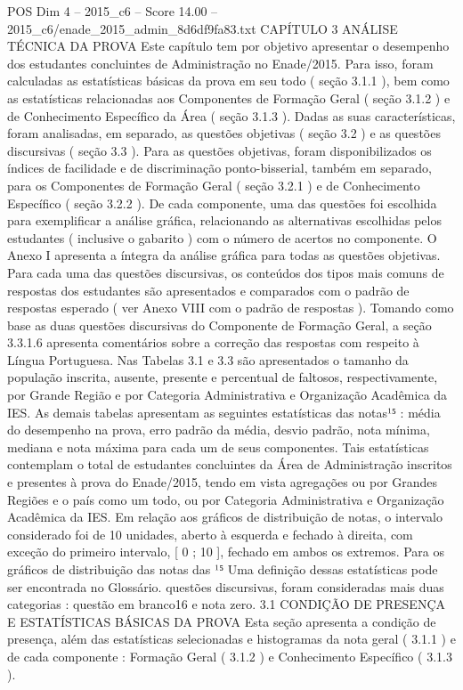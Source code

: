 \begin{textsample}{POS Dim 4 – 2015\_c6 – Score 14.00 – 2015\_c6/enade\_2015\_admin\_8d6df9fa83.txt}  \label{ex:f4_pos_023}
CAPÍTULO 3 ANÁLISE TÉCNICA DA PROVA Este capítulo tem por objetivo apresentar o desempenho dos estudantes concluintes de Administração no Enade/2015.
Para isso, foram calculadas as estatísticas básicas da prova em seu todo ( seção 3.1.1 ), bem como as estatísticas relacionadas aos Componentes de Formação Geral ( seção 3.1.2 ) e de Conhecimento Específico da Área ( seção 3.1.3 ).
Dadas as suas características, foram analisadas, em separado, as questões objetivas ( seção 3.2 ) e as questões discursivas ( seção 3.3 ).
Para as questões objetivas, foram disponibilizados os índices de facilidade e de discriminação ponto-bisserial, também em separado, para os Componentes de Formação Geral ( seção 3.2.1 ) e de Conhecimento Específico ( seção 3.2.2 ).
De cada componente, uma das questões foi escolhida para exemplificar a análise gráfica, relacionando as alternativas escolhidas pelos estudantes ( inclusive o gabarito ) com o número de acertos no componente.
O Anexo I apresenta a íntegra da análise gráfica para todas as questões objetivas.
Para cada uma das questões discursivas, os conteúdos dos tipos mais comuns de respostas dos estudantes são apresentados e comparados com o padrão de respostas esperado ( ver Anexo VIII com o padrão de respostas ).
Tomando como base as duas questões discursivas do Componente de Formação Geral, a seção 3.3.1.6 apresenta comentários sobre a correção das respostas com respeito à Língua Portuguesa.
Nas Tabelas 3.1 e 3.3 são apresentados o tamanho da população inscrita, ausente, presente e percentual de faltosos, respectivamente, por Grande Região e por Categoria Administrativa e Organização Acadêmica da IES.
As demais tabelas apresentam as seguintes estatísticas das notas¹⁵ : média do desempenho na prova, erro padrão da média, desvio padrão, nota mínima, mediana e nota máxima para cada um de seus componentes.
Tais estatísticas contemplam o total de estudantes concluintes da Área de Administração inscritos e presentes à prova do Enade/2015, tendo em vista agregações ou por Grandes Regiões e o país como um todo, ou por Categoria Administrativa e Organização Acadêmica da IES.
Em relação aos gráficos de distribuição de notas, o intervalo considerado foi de 10 unidades, aberto à esquerda e fechado à direita, com exceção do primeiro intervalo, [ 0 ; 10 ], fechado em ambos os extremos.
Para os gráficos de distribuição das notas das ¹⁵ Uma definição dessas estatísticas pode ser encontrada no Glossário. questões discursivas, foram consideradas mais duas categorias : questão em branco16 e nota zero. 3.1 CONDIÇÃO DE PRESENÇA E ESTATÍSTICAS BÁSICAS DA PROVA Esta seção apresenta a condição de presença, além das estatísticas selecionadas e histogramas da nota geral ( 3.1.1 ) e de cada componente : Formação Geral ( 3.1.2 ) e Conhecimento Específico ( 3.1.3 ).

\end{textsample}
